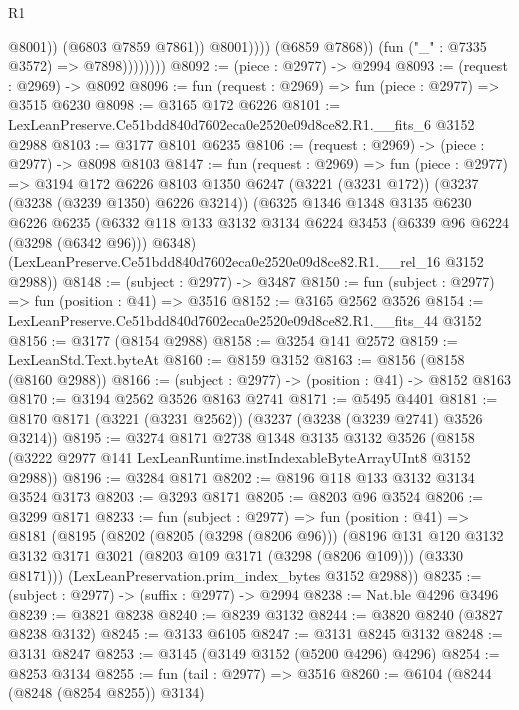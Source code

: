 \begin{lexlean}{R1}
\begin{coremodule}
                                  @8001))
                              (@6803 @7859 @7861))
                            @8001))))
                    (@6859 @7868))
                  (fun ("_" : @7335 @3572) => @7898))))))))
@8092 := (piece : @2977) -> @2994
@8093 := (request : @2969) -> @8092
@8096 := fun (request : @2969) => fun (piece : @2977) => @3515 @6230
@8098 := @3165 @172 @6226
@8101 := LexLeanPreserve.Ce51bdd840d7602eca0e2520e09d8ce82.R1.__fits_6 @3152 @2988
@8103 := @3177 @8101 @6235
@8106 := (request : @2969) -> (piece : @2977) -> @8098 @8103
@8147 := fun (request : @2969) =>
  fun (piece : @2977) =>
  @3194
    @172
    @6226
    @8103
    @1350
    @6247
    (@3221 (@3231 @172))
    (@3237 (@3238 (@3239 @1350) @6226 @3214))
    (@6325
      @1346
      @1348
      @3135
      @6230
      @6226
      @6235
      (@6332 @118 @133 @3132 @3134 @6224 @3453 (@6339 @96 @6224 (@3298 (@6342 @96))) @6348)
      (LexLeanPreserve.Ce51bdd840d7602eca0e2520e09d8ce82.R1.__rel_16 @3152 @2988))
@8148 := (subject : @2977) -> @3487
@8150 := fun (subject : @2977) => fun (position : @41) => @3516
@8152 := @3165 @2562 @3526
@8154 := LexLeanPreserve.Ce51bdd840d7602eca0e2520e09d8ce82.R1.__fits_44 @3152
@8156 := @3177 (@8154 @2988)
@8158 := @3254 @141 @2572
@8159 := LexLeanStd.Text.byteAt
@8160 := @8159 @3152
@8163 := @8156 (@8158 (@8160 @2988))
@8166 := (subject : @2977) -> (position : @41) -> @8152 @8163
@8170 := @3194 @2562 @3526 @8163 @2741
@8171 := @5495 @4401
@8181 := @8170 @8171 (@3221 (@3231 @2562)) (@3237 (@3238 (@3239 @2741) @3526 @3214))
@8195 := @3274
    @8171
    @2738
    @1348
    @3135
    @3132
    @3526
    (@8158 (@3222 @2977 @141 LexLeanRuntime.instIndexableByteArrayUInt8 @3152 @2988))
@8196 := @3284 @8171
@8202 := @8196 @118 @133 @3132 @3134 @3524 @3173
@8203 := @3293 @8171
@8205 := @8203 @96 @3524
@8206 := @3299 @8171
@8233 := fun (subject : @2977) =>
  fun (position : @41) =>
  @8181
    (@8195
      (@8202
        (@8205 (@3298 (@8206 @96)))
        (@8196
          @131
          @120
          @3132
          @3132
          @3171
          @3021
          (@8203 @109 @3171 (@3298 (@8206 @109)))
          (@3330 @8171)))
      (LexLeanPreservation.prim_index_bytes @3152 @2988))
@8235 := (subject : @2977) -> (suffix : @2977) -> @2994
@8238 := Nat.ble @4296 @3496
@8239 := @3821 @8238
@8240 := @8239 @3132
@8244 := @3820 @8240 (@3827 @8238 @3132)
@8245 := @3133 @6105
@8247 := @3131 @8245 @3132
@8248 := @3131 @8247
@8253 := @3145 (@3149 @3152 (@5200 @4296) @4296)
@8254 := @8253 @3134
@8255 := fun (tail : @2977) => @3516
@8260 := @6104 (@8244 (@8248 (@8254 @8255)) @3134)

\end{coremodule}
\end{lexlean}
